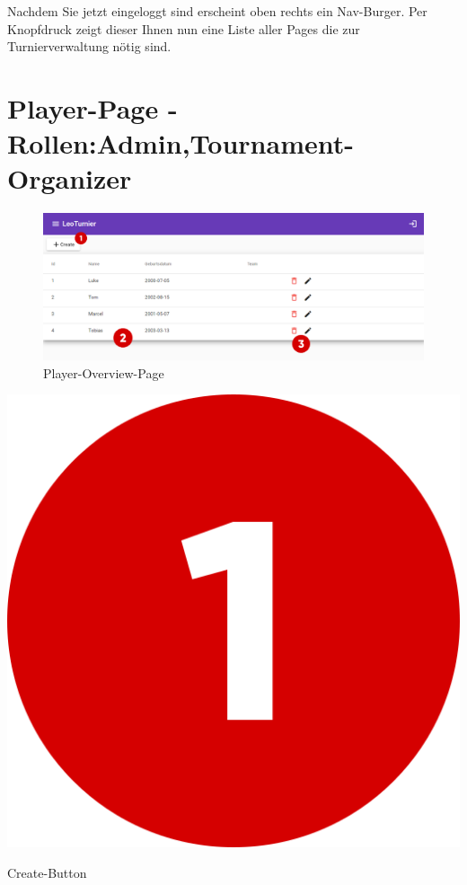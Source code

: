Nachdem Sie jetzt eingeloggt sind erscheint oben rechts ein Nav-Burger. Per Knopfdruck zeigt dieser Ihnen nun eine Liste aller Pages die zur
Turnierverwaltung nötig sind.

\newpage
\section{Player-Page - Rollen:Admin,Tournament-Organizer}
\begin{figure}[H]
    \includegraphics[scale=0.425]{pics/user-guide/player-overview-page.PNG}
    \caption{Player-Overview-Page}
\end{figure}
\bigskip

\includegraphics[scale=0.05]{pics/user-guide/numbers/number-1.png} \begin{LARGE} Create-Button \end{LARGE}

